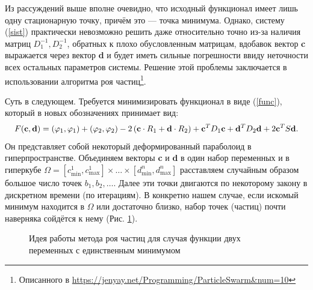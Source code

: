 \documentclass[a4paper, 12pt]{article}
\begin{document}
Из рассуждений выше вполне очевидно, что исходный функционал имеет лишь одну стационарную точку, причём это --- точка минимума.
Однако, систему (\ref{sist}) практически невозможно решить даже относительно точно из-за наличия матриц $D_1^{-1}, D_2^{-1}$, обратных к плохо обусловленным матрицам, вдобавок
вектор {\bf c} выражается через вектор {\bf d} и будет иметь сильные погрешности ввиду неточности всех остальных параметров системы.
Решение этой проблемы заключается в использовании алгоритма роя частиц\footnote{Описанного в \url{https://jenyay.net/Programming/ParticleSwarm&num=10}}.

Суть в следующем. Требуется минимизировать функционал в виде (\ref{func}), который в новых обозначениях принимает вид:
\begin{equation}
  F({\bf c},{\bf d})=(\varphi_1,\varphi_1)+(\varphi_2,\varphi_2)-2\left({\bf c}\cdot R_1+{\bf d}\cdot R_2\right)+
  {\bf c}^T D_1 {\bf c}+{\bf d}^T D_2 {\bf d}+2{\bf c}^T S {\bf d}.
\end{equation}
Он представляет собой некоторый деформированный параболоид в гиперпространстве.
Объединяем векторы {\bf c} и {\bf d} в один набор переменных и в гиперкубе $\Omega=[c^1_{\min},c^1_{\max}] \times \dots \times [d^n_{\min},d^n_{\max}]$
расставляем случайным образом большое число точек $b_1, b_2, \dots$.
Далее эти точки двигаются по некоторому закону в дискретном времени (по итерациям).
В конкретно нашем случае, если искомый минимум находится в $\Omega$ или достаточно близко, набор точек (частиц) почти наверняка сойдётся к нему (Рис. \ref{parab}).

\begin{figure}[h!]
  \caption{Идея работы метода роя частиц для случая функции двух переменных с единственным минимумом}
  \label{parab}
\end{figure}
\end{document}

